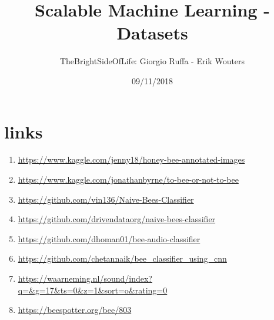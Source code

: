 \documentclass[a4paper]{article}
\title{Scalable Machine Learning - Datasets}
\author{TheBrightSideOfLife: Giorgio Ruffa - Erik Wouters}
\date{09/11/2018}
\begin{document}
\maketitle

\section{links}

\begin{enumerate}
\item \url{https://www.kaggle.com/jenny18/honey-bee-annotated-images}
\item \url{https://www.kaggle.com/jonathanbyrne/to-bee-or-not-to-bee}
\item \url{https://github.com/vin136/Naive-Bees-Classifier}
\item \url{https://github.com/drivendataorg/naive-bees-classifier}
\item \url{https://github.com/dhoman01/bee-audio-classifier}
\item \url{https://github.com/chetannaik/bee_classifier_using_cnn}
\item \url{https://waarneming.nl/sound/index?q=&g=17&ts=0&z=1&sort=o&rating=0}
\item \url{https://beespotter.org/bee/803}
\end{enumerate}
\end{document}
